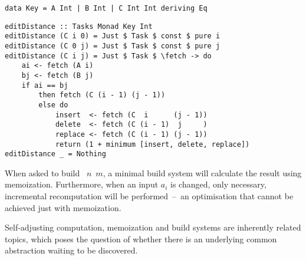 \vspace{1mm}
\begin{verbatim}
data Key = A Int | B Int | C Int Int deriving Eq
\end{verbatim}
\begin{verbatim}
editDistance :: Tasks Monad Key Int
editDistance (C i 0) = Just $ Task $ const $ pure i
editDistance (C 0 j) = Just $ Task $ const $ pure j
editDistance (C i j) = Just $ Task $ \fetch -> do
    ai <- fetch (A i)
    bj <- fetch (B j)
    if ai == bj
        then fetch (C (i - 1) (j - 1))
        else do
            insert  <- fetch (C  i      (j - 1))
            delete  <- fetch (C (i - 1)  j     )
            replace <- fetch (C (i - 1) (j - 1))
            return (1 + minimum [insert, delete, replace])
editDistance _ = Nothing
\end{verbatim}
\vspace{1mm}

\noindent
When asked to build ~$n$~$m$, a minimal build system will calculate the
result using memoization. Furthermore, when an input $a_i$ is changed, only
necessary, incremental recomputation will be performed~--~an optimisation that
cannot be achieved just with memoization.

Self-adjusting computation, memoization and build systems are inherently related
topics, which poses the question of whether there is an underlying common
abstraction waiting to be discovered.
